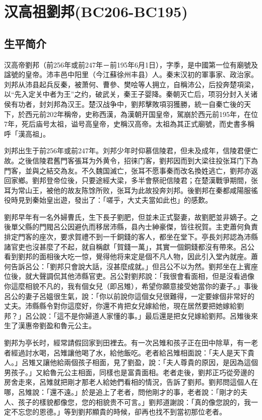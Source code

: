
\section{汉高祖劉邦\tiny(BC206-BC195)}

\subsection{生平简介}

汉高帝劉邦（前256年或前247年－前195年6月1日），字季，是中國第一位有廟號及諡號的皇帝。沛丰邑中阳里（今江蘇徐州丰县）人。秦末汉初的軍事家、政治家。刘邦从沛县起兵反秦，被萧何、曹參、樊哙等人拥立，自稱沛公，后投奔楚項梁，以“先入定关中者为王”之约，破武关，秦王子婴降。秦朝灭亡后，项羽分封入关诸侯有功者，封刘邦為汉王。楚汉战争中，劉邦擊敗項羽獲勝，統一自秦亡後的天下，於西元前202年稱帝，史称西漢，為漢朝开国皇帝，駕崩於西元前195年，在位7年，死后庙号太祖，谥号高皇帝，史稱汉高帝。太祖為其正式廟號，而史書多稱呼「漢高祖」。

刘邦出生于前256年或前247年。刘邦少年时仰慕信陵君，但未及成年，信陵君便亡故。之後信陵君舊門客張耳为外黄令，招徕门客，劉邦因而到大梁往投张耳门下為門客，並與之結交為友。不久魏国滅亡，张耳不愿事秦而改名換姓逃亡，劉邦亦返回家鄉。劉邦登帝位後，只要途經大梁，多半會祭祀信陵君；在楚漢戰爭期間，张耳为常山王，被他的故友陈馀所败，张耳为此故投奔刘邦。後劉邦在秦都咸陽服徭役時見到秦始皇出遊，發出了：「嗟乎，大丈夫當如此也」的感歎。

劉邦早年有一名外婦曹氏，生下長子劉肥，但並未正式娶妻，故劉肥並非嫡子。之後單父縣的門閥呂公因避仇而移居沛縣，县內士紳豪傑，皆往祝賀。主吏蕭何負責排定門客的座次，要求賀禮不到一千銅錢的客人，都坐在堂下。亭長刘邦認為沛縣諸官吏也沒甚麼了不起，就自稱獻「賀錢一萬」，其實一個銅錢都沒有帶來。呂公看到劉邦的面相後大吃一惊，覺得他将来定是個不凡人物，因此引入堂內就座。蕭何告訴呂公：「劉邦只會說大話，沒甚麼成就。」但吕公不以为然。劉邦坐在上賓座位後，就大聲調侃其他沛縣官吏。呂公對劉邦說：「我很會看面相，但是沒看過像你這麼相貌不凡的，我有個女兒（即呂雉），希望你願意接受她當你的妻子。」事後呂公的妻子呂媼很生氣，說：「你以前說你這個女兒很難得，一定要嫁個非常好的丈夫。沛縣縣令對你這麼好，你還不肯把女兒嫁給他，現在居然要把她嫁給劉邦？」呂公說：「這不是你婦道人家懂的事。」最后還是把女兒嫁給劉邦。呂雉後來生了漢惠帝劉盈和魯元公主。

劉邦为亭长时，經常請假回家到田裡去。有一次呂雉和孩子正在田中除草，有一老者經過討水喝，呂雉讓他喝了水，給他飯吃。老者給呂雉相面說：「夫人是天下貴人。」呂雉又讓他給兩個孩子相面，見了劉盈，說：「夫人尊貴的原因，是因為這個男孩子。」又給魯元公主相面，同樣也是富貴面相。老者走後，劉邦正巧從旁邊的房舍走來，呂雉就把剛才那老人給她們看相的情況，告訴了劉邦。劉邦問這個人在哪，呂雉說：「還不遠。」於是追上了老者，問他剛才的事，老者說：「剛才的夫人、孩子的樣貌都像您，您的相貌贵不可言。」劉邦道謝說：「真的像您說的，我一定不忘您的恩德。」等到劉邦顯貴的時候，卻再也找不到當初那位老者。

